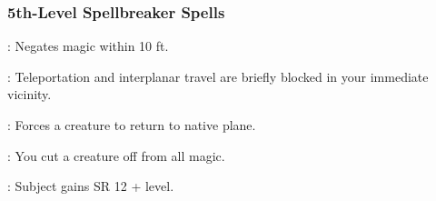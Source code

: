 \subsubsection{5th-Level Spellbreaker Spells}
\begin{list}{}{\leftmargin=1em}
  \item {}: Negates magic within 10 ft.
  \item {}: Teleportation and interplanar travel are briefly blocked in your immediate vicinity.
  \item {}: Forces a creature to return to native plane.
  \item {}: You cut a creature off from all magic.
  \item {}: Subject gains SR 12 + level.
\end{list}